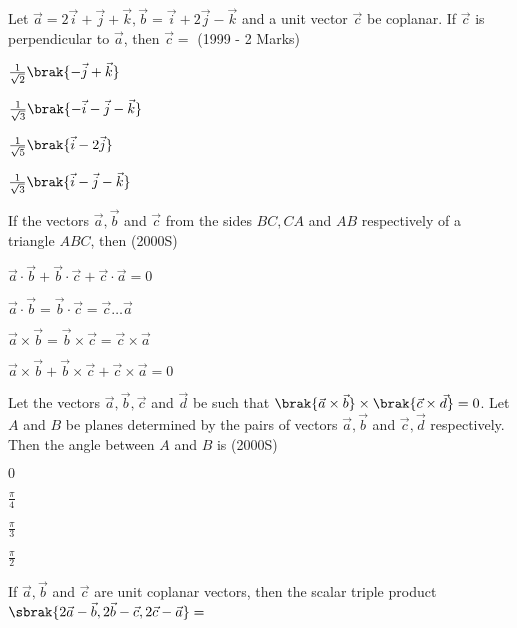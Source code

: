 \item Let $\vec{a}=2\vec{i}+\vec{j}+\vec{k},\vec{b}=\vec{i}+2\vec{j}-\vec{k}$ and a unit vector $\vec{c}$ be coplanar. If $\vec{c}$ is perpendicular to $\vec{a}$, then $\vec{c}=$
\hfill (1999 - 2 Marks)
\begin{enumerate}
\begin{multicols}{2}
\item $\frac{1}{\sqrt{2}}\brak{-\vec{j}+\vec{k}}$
\item $\frac{1}{\sqrt{3}}\brak{-\vec{i}-\vec{j}-\vec{k}}$ \item $\frac{1}{\sqrt{5}}\brak{\vec{i}-2\vec{j}}$    
\item $\frac{1}{\sqrt{3}}\brak{\vec{i}-\vec{j}-\vec{k}}$  \end{multicols}
\end{enumerate}
\item If the vectors $\vec{a},\vec{b}$ and $\vec{c}$ from the sides $BC,CA$ and $AB$ respectively of a triangle $ABC$, then
\hfill (2000S)
\begin{enumerate}
\begin{multicols}{2}
\item $\vec{a} \cdot \vec{b}+\vec{b} \cdot \vec{c}+\vec{c} \cdot \vec{a} = 0$
\item $\vec{a} \cdot \vec{b}=\vec{b} \cdot \vec{c}=\vec{c} \dots \vec{a}$
\item $\vec{a} \times \vec{b}=\vec{b} \times \vec{c}=\vec{c} \times \vec{a}$
\item $\vec{a} \times \vec{b}+\vec{b} \times \vec{c}+\vec{c} \times \vec{a}=0$
\end{multicols}
\end{enumerate}
\item Let the vectors $\vec{a},\vec{b},\vec{c}$ and $\vec{d}$ be such that $\brak{\vec{a} \times \vec{b}} \times \brak{\vec{c} \times \vec{d}} = 0$. Let $A$ and $B$ be planes determined by the pairs of vectors $\vec{a},\vec{b}$ and $\vec{c},\vec{d}$ respectively. Then the angle between $A$ and $B$ is 
\hfill (2000S)
\begin{enumerate}
\begin{multicols}{4}
 \item $0$
 \item $\frac{\pi}{4}$
 \item $\frac{\pi}{3}$
 \item $\frac{\pi}{2}$
\end{multicols}
\end{enumerate}
\item If $\vec{a},\vec{b}$ and $\vec{c}$ are unit coplanar vectors, then the scalar triple product $\sbrak{2\vec{a}-\vec{b},2\vec{b}-\vec{c},2\vec{c}-\vec{a}} = $
